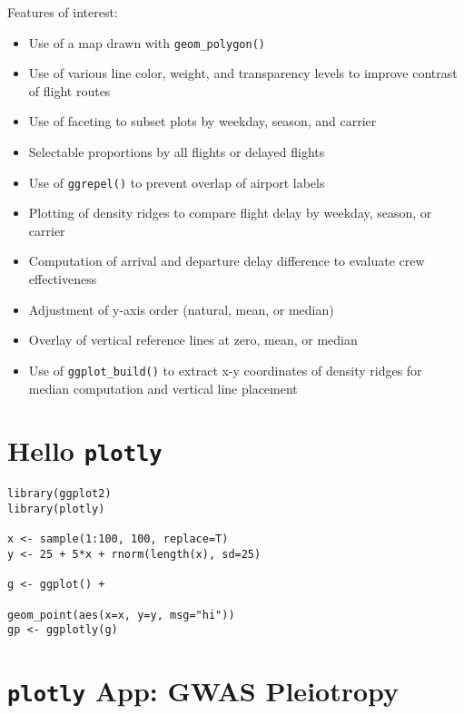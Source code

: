 \documentclass[10pt, letterpaper]{article}
\begin{document}
\begin{spacing}{1.0}
Features of interest:

\begin{itemize}[noitemsep]
    \item Use of a map drawn with \texttt{geom\_polygon()}
    \item Use of various line color, weight, and transparency levels to improve contrast of flight routes
    \item Use of faceting to subset plots by weekday, season, and carrier
    \item Selectable proportions by all flights or delayed flights
    \item Use of \texttt{ggrepel()} to prevent overlap of airport labels
    \item Plotting of density ridges to compare flight delay by weekday, season, or carrier
    \item Computation of arrival and departure delay difference to evaluate crew effectiveness
    \item Adjustment of y-axis order (natural, mean, or median)
    \item Overlay of vertical reference lines at zero, mean, or median
    \item Use of \texttt{ggplot\_build()} to extract x-y coordinates of density ridges for median computation and vertical line placement
\end{itemize}


\section{Hello \texttt{plotly}}\label{sec:hello}

\begin{scriptsize}
\begin{verbatim}
library(ggplot2)
library(plotly)

x <- sample(1:100, 100, replace=T)
y <- 25 + 5*x + rnorm(length(x), sd=25)

g <- ggplot() +

geom_point(aes(x=x, y=y, msg="hi"))
gp <- ggplotly(g)
\end{verbatim}
\end{scriptsize}


\section{\texttt{plotly} App:  GWAS Pleiotropy}\label{sec:pleiotropy}


\end{spacing}
\end{document}

